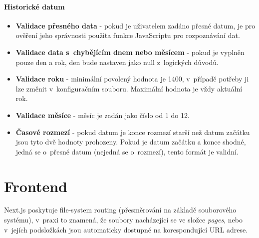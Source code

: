 \documentclass[12pt, a4paper,
  oneside,      %
]{report}
\begin{document}
\subsubsection{Historické datum}
\begin{itemize}
	\item \textbf{Validace přesného data} - pokud je uživatelem zadáno přesné datum, je pro ověření jeho správnosti použita funkce JavaScriptu pro rozpoznávání dat.
	\item \textbf{Validace data s~chybějícím dnem nebo měsícem} - pokud je vyplněn pouze den a rok, den bude nastaven jako null z~logických důvodů.
	\item \textbf{Validace roku} - minimální povolený hodnota je 1400, v~případě potřeby ji lze změnit v~konfiguračním souboru. Maximální hodnota je vždy aktuální rok.
	\item \textbf{Validace měsíce} - měsíc je zadán jako číslo od 1 do 12.
	\item \textbf{Časové rozmezí} - pokud datum je konce rozmezí starší než datum začátku jsou tyto dvě hodnoty prohozeny. Pokud je datum začátku a konce shodné, jedná se o~přesné datum (nejedná se o~rozmezí), tento formát je validní.
\end{itemize}


\chapter{Frontend}\label{subsection:fileSystemRouting}
Next.js poskytuje file-system routing (přesměrování na základě souborového systému), v~praxi to znamená, že soubory nacházející se ve složce \textit{pages}, nebo v~jejích podsložkách jsou automaticky dostupné na korespondující URL adrese.
\end{document}
